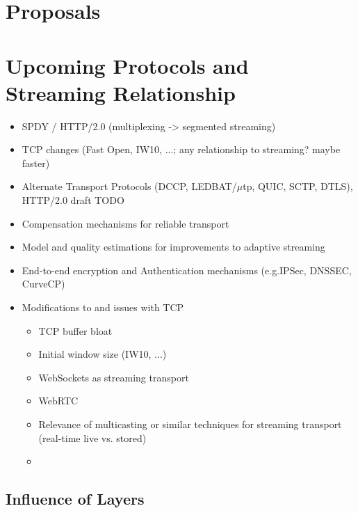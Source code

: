 \section{Proposals}


\section{Upcoming Protocols and Streaming Relationship}

\begin{itemize}
\item SPDY / HTTP/2.0 (multiplexing -> segmented streaming)
\item TCP changes (Fast Open, IW10, ...; any relationship to streaming? maybe faster)
\item Alternate Transport Protocols (DCCP\cite{rfc4340}, LEDBAT\cite{rfc6817}/$\mu$tp\cite{bt2010utp}, QUIC, SCTP, DTLS), HTTP/2.0 draft TODO
\end{itemize}


\begin{itemize}
\item Compensation mechanisms for reliable transport
\item Model and quality estimations for improvements to adaptive streaming
\item End-to-end encryption and Authentication mechanisms (e.g.IPSec, DNSSEC, CurveCP) %
\item Modifications to and issues with TCP
 \begin{itemize}
 \item TCP buffer bloat
 \item Initial window size (IW10, ...)
 \item WebSockets as streaming transport \cite{w3c2011websockets} \cite{heise2011websockets}
 \item WebRTC
 \item Relevance of multicasting or similar techniques for streaming transport (real-time live vs. stored)
  
 \item
 \end{itemize}
 \end{itemize}


\subsection{Influence of Layers}

